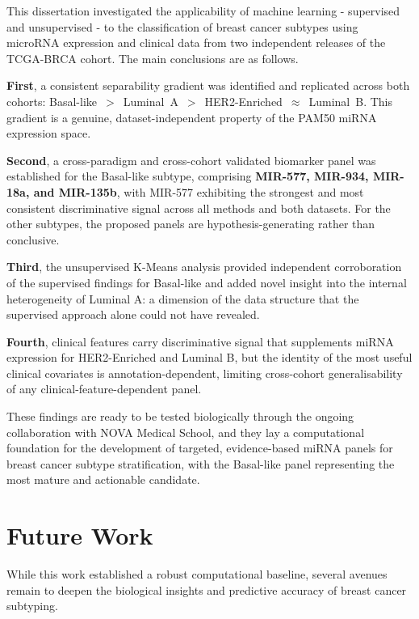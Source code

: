 This dissertation investigated the applicability of machine learning - supervised and
unsupervised - to the classification of breast cancer subtypes using microRNA
expression and clinical data from two independent releases of the TCGA-BRCA cohort.
The main conclusions are as follows.
 
\textbf{First}, a consistent separability gradient was identified and replicated across
both cohorts: \mbox{Basal-like $>$ Luminal A $>$ HER2-Enriched $\approx$ Luminal B}.
This gradient is a genuine, dataset-independent property of the PAM50 miRNA expression
space.
 
\textbf{Second}, a cross-paradigm and cross-cohort validated biomarker panel was
established for the Basal-like subtype, comprising \textbf{MIR-577, MIR-934, MIR-18a,
and MIR-135b}, with MIR-577 exhibiting the strongest and most consistent discriminative
signal across all methods and both datasets. For the other subtypes, the proposed
panels are hypothesis-generating rather than conclusive.
 
\textbf{Third}, the unsupervised K-Means analysis provided independent corroboration
of the supervised findings for Basal-like and added novel insight into the internal
heterogeneity of Luminal A: a dimension of the data structure that the supervised
approach alone could not have revealed.
 
\textbf{Fourth}, clinical features carry discriminative signal that supplements miRNA
expression for HER2-Enriched and Luminal B, but the identity of the most useful
clinical covariates is annotation-dependent, limiting cross-cohort generalisability
of any clinical-feature-dependent panel.
 
These findings are ready to be tested biologically through the ongoing collaboration
with NOVA Medical School, and they lay a computational foundation for the development
of targeted, evidence-based miRNA panels for breast cancer subtype stratification,
with the Basal-like panel representing the most mature and actionable candidate.

\section{Future Work}
\label{sec:future_work}

While this work established a robust computational baseline, several avenues
remain to deepen the biological insights and predictive accuracy of breast
cancer subtyping.


